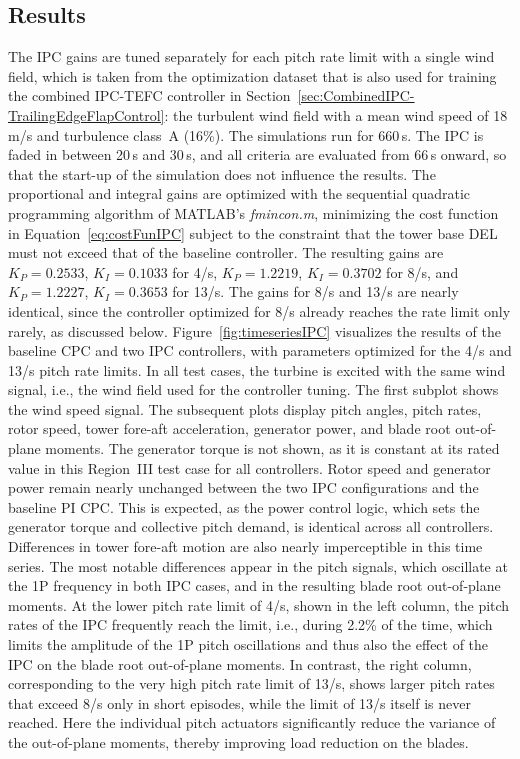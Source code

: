 \subsection{Results} \label{subsection: IPCResults}
The IPC gains are tuned separately for each pitch rate limit with a single wind field, which is taken from the optimization dataset that is also used for training the combined IPC-TEFC controller in Section~\ref{sec:CombinedIPC-TrailingEdgeFlapControl}: the turbulent wind field with a mean wind speed of 18\,m/s and turbulence class~A (16\%). The simulations run for 660\,s. The IPC is faded in between 20\,s and 30\,s, and all criteria are evaluated from 66\,s onward, so that the start-up of the simulation does not influence the results. The proportional and integral gains are optimized with the sequential quadratic programming algorithm of MATLAB's \textit{fmincon.m}, minimizing the cost function in Equation~\eqref{eq:costFunIPC} subject to the constraint that the tower base DEL must not exceed that of the baseline controller. The resulting gains are $K_P = 0.2533$, $K_I = 0.1033$ for 4\textdegree/s, $K_P = 1.2219$, $K_I = 0.3702$ for 8\textdegree/s, and $K_P = 1.2227$, $K_I = 0.3653$ for 13\textdegree/s. The gains for 8\textdegree/s and 13\textdegree/s are nearly identical, since the controller optimized for 8\textdegree/s already reaches the rate limit only rarely, as discussed below.
%
Figure~\ref{fig:timeseriesIPC} visualizes the results of the baseline CPC and two IPC controllers, with parameters optimized for the 4\textdegree/s and 13\textdegree/s pitch rate limits. In all test cases, the turbine is excited with the same wind signal, i.e., the wind field used for the controller tuning. The first subplot shows the wind speed signal. The subsequent plots display pitch angles, pitch rates, rotor speed, tower fore-aft acceleration, generator power, and blade root out-of-plane moments. The generator torque is not shown, as it is constant at its rated value in this Region~III test case for all controllers. Rotor speed and generator power remain nearly unchanged between the two IPC configurations and the baseline PI CPC. This is expected, as the power control logic, which sets the generator torque and collective pitch demand, is identical across all controllers. Differences in tower fore-aft motion are also nearly imperceptible in this time series. The most notable differences appear in the pitch signals, which oscillate at the 1P frequency in both IPC cases, and in the resulting blade root out-of-plane moments. At the lower pitch rate limit of 4\textdegree/s, shown in the left column, the pitch rates of the IPC frequently reach the limit, i.e., during 2.2\% of the time, which limits the amplitude of the 1P pitch oscillations and thus also the effect of the IPC on the blade root out-of-plane moments. In contrast, the right column, corresponding to the very high pitch rate limit of 13\textdegree/s, shows larger pitch rates that exceed 8\textdegree/s only in short episodes, while the limit of 13\textdegree/s itself is never reached. Here the individual pitch actuators significantly reduce the variance of the out-of-plane moments, thereby improving load reduction on the blades.
